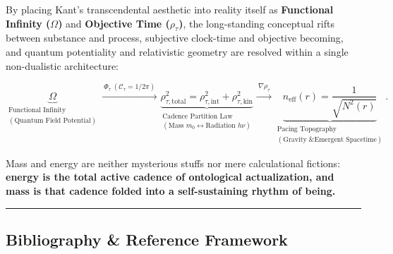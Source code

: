 \documentclass[
]{article}
\begin{document}
By placing Kant's transcendental aesthetic into reality itself as
\textbf{Functional Infinity (\(\Omega\))} and \textbf{Objective Time
(\(\rho_\tau\))}, the long-standing conceptual rifts between substance
and process, subjective clock-time and objective becoming, and quantum
potentiality and relativistic geometry are resolved within a single
non-dualistic architecture:

\[\underbrace{\Omega}_{\substack{\text{Functional Infinity} \\ (\text{Quantum Field Potential})}} \xrightarrow{\ \Phi_\tau \ (\mathcal{C}_\tau = 1/2\pi) \ } \underbrace{\rho_{\tau,\text{total}}^2 = \rho_{\tau,\text{int}}^2 + \rho_{\tau,\text{kin}}^2}_{\substack{\text{Cadence Partition Law} \\ (\text{Mass } m_0 \leftrightarrow \text{Radiation } h\nu)}} \xrightarrow{\ \nabla \rho_\tau \ } \underbrace{n_{\text{eff}}(r) = \frac{1}{\sqrt{N^2(r)}}}_{\substack{\text{Pacing Topography} \\ (\text{Gravity \& Emergent Spacetime})}}.\]

Mass and energy are neither mysterious stuffs nor mere calculational
fictions: \textbf{energy is the total active cadence of ontological
actualization, and mass is that cadence folded into a self-sustaining
rhythm of being.}

\begin{center}\rule{0.5\linewidth}{0.5pt}\end{center}

\subsection{Bibliography \& Reference
Framework}\label{bibliography-reference-framework}
\end{document}
